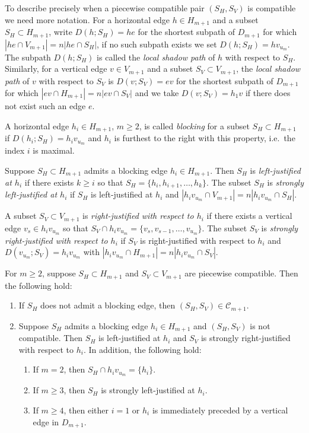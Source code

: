\documentclass[smallextended,envcountsect,envcountsame]{svjour3}
\numberwithin{equation}{section}
\newcommand{\cC}{\mathcal{C}}
\begin{document}
To describe precisely when a piecewise compatible pair $(S_H,S_V)$ is compatible we need more notation.
For a horizontal edge $h\in H_{m+1}$ and a subset $S_H\subset H_{m+1}$, write $D(h;S_H)=he$ for the shortest subpath of $D_{m+1}$ for which $|he\cap V_{m+1}|=n|he\cap S_H|$, if no such subpath exists we set $D(h;S_H)=hv_{u_m}$.
The subpath $D(h;S_H)$ is called the \emph{local shadow path} of $h$ with respect to $S_H$.
Similarly, for a vertical edge $v\in V_{m+1}$ and a subset $S_V\subset V_{m+1}$, the \emph{local shadow path} of $v$ with respect to $S_V$ is $D(v;S_V)=ev$ for the shortest subpath of $D_{m+1}$ for which $|ev\cap H_{m+1}|=n|ev\cap S_V|$ and we take $D(v;S_V)=h_1v$ if there does not exist such an edge $e$.
\begin{definition}
  \cite[Definition 3.17]{rupel}
  A horizontal edge $h_i\in H_{m+1}$, $m\ge2$, is called \emph{blocking} for a subset $S_H\subset H_{m+1}$ if $D(h_i;S_H)=h_iv_{u_m}$ and $h_i$ is furthest to the right with this property, i.e.\ the index $i$ is maximal. 

  Suppose $S_H\subset H_{m+1}$ admits a blocking edge $h_i\in H_{m+1}$.
  Then $S_H$ is \emph{left-justified at $h_i$} if there exists $k\ge i$ so that $S_H=\{h_i,h_{i+1},\ldots,h_k\}$.
  The subset $S_H$ is \emph{strongly left-justified at $h_i$} if $S_H$ is left-justified at $h_i$ and $|h_iv_{u_m}\cap V_{m+1}|=n|h_iv_{u_m}\cap S_H|$.

  A subset $S_V\subset V_{m+1}$ is \emph{right-justified with respect to $h_i$} if there exists a vertical edge $v_s\in h_iv_{u_m}$ so that $S_V\cap h_iv_{u_m}=\{v_s,v_{s-1},\ldots,v_{u_m}\}$.
  The subset $S_V$ is \emph{strongly right-justified with respect to $h_i$} if $S_V$ is right-justified with respect to $h_i$ and $D(v_{u_m};S_V)=h_iv_{u_m}$ with $|h_iv_{u_m}\cap H_{m+1}|=n|h_iv_{u_m}\cap S_V|$.
\end{definition}

\begin{theorem}
  \label{th:blocking edge conditions}
  \cite[Theorem 3.20 and Corollary 3.22]{rupel}
  For $m\ge2$, suppose $S_H\subset H_{m+1}$ and $S_V\subset V_{m+1}$ are piecewise compatible. 
  Then the following hold:
  \begin{enumerate}
    \item If $S_H$ does not admit a blocking edge, then $(S_H,S_V)\in\cC_{m+1}$.
    \item Suppose $S_H$ admits a blocking edge $h_i\in H_{m+1}$ and $(S_H,S_V)$ is not compatible.
      Then $S_H$ is left-justified at $h_i$ and $S_V$ is strongly right-justified with respect to $h_i$.
      In addition, the following hold:
      \begin{enumerate}
        \item If $m=2$, then $S_H\cap h_iv_{u_m}=\{h_i\}$.
        \item If $m\ge3$, then $S_H$ is strongly left-justified at $h_i$.
        \item If $m\ge4$, then either $i=1$ or $h_i$ is immediately preceded by a vertical edge in $D_{m+1}$.
      \end{enumerate}
  \end{enumerate}
\end{theorem}
\end{document}
